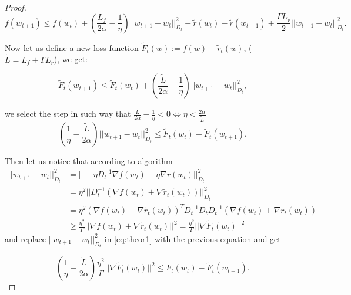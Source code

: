\begin{proof}
\begin{equation*}
    f(w_{t+1}) \leq f(w_t) + \left( \frac{L_f}{2\alpha} - \frac{1}{\eta} \right) ||w_{t+1} - w_t||_{D_t}^2 + \tilde{r}(w_t) - \tilde{r}(w_{t+1}) + \frac{\Gamma L_{\tilde{r}}}{2}||w_{t+1}-w_t||_{D_t}^2.
\end{equation*}

Now let us define a new loss function
$\widetilde{F}_t(w) := f(w) + \tilde{r}_t(w)$, ($\tilde{L}=L_f + \Gamma L_{r}$), we get:

\begin{equation*}
    \widetilde{F}_t(w_{t+1}) \leq \widetilde{F}_t(w_t) + \left( \frac{\widetilde{L}}{2\alpha} - \frac{1}{\eta}  \right) ||w_{t+1} - w_t||_{D_t}^2,
\end{equation*}

we select the step in such way that $ \frac{\tilde{L}}{2\alpha} - \frac{1}{\eta} < 0 \Leftrightarrow \eta < \frac{2 \alpha}{\tilde{L}}$
\begin{equation}
\label{eq:theor1}
    \left(\frac{1}{\eta} - \frac{\tilde{L}}{2\alpha}   \right) ||w_{t+1} - w_t||_{D_t}^2 \leq \tilde{F}_t(w_t) - \tilde{F}_t(w_{t+1}).
\end{equation}

Then let us notice that according to algorithm
\begin{equation*}
\begin{aligned}
    ||w_{t+1} - w_t||^2_{D_t} &= ||-\eta D_t^{-1} \nabla f(w_t) - \eta \nabla r(w_t)||_{D_t}^2 \\
    &= \eta^2 || D_t^{-1} 
    ( \nabla f(w_t) + \nabla \widetilde{r}_t(w_t) ) ||_{D_t}^2 \\
    &= \eta^2  ( \nabla f(w_t) + \nabla \widetilde{r}_t(w_t))^T D_t^{-1} D_t  D_t^{-1} 
    ( \nabla f(w_t) + \nabla \widetilde{r}_t(w_t) ) \\
    &\ge \frac{\eta^2}{\Gamma} || \nabla f(w_t) + \nabla \widetilde{r}_t(w_t) ||^2 = \frac{\eta^2}{\Gamma} ||\nabla\widetilde{F}_t(w_t)||^2
\end{aligned}
\end{equation*}
and replace $||w_{t+1} - w_t||^2_{D_t}$ in \eqref{eq:theor1} with the previous equation and get

\begin{equation}
\label{eq:theor1-1}
    \left(\frac{1}{\eta} - \frac{\tilde{L}}{2\alpha}   \right) \frac{\eta^2}{\Gamma} || \nabla\widetilde{F}_t(w_t) ||^2 \leq \tilde{F}_t(w_t) - \tilde{F}_t(w_{t+1}).
\end{equation}


\end{proof}
